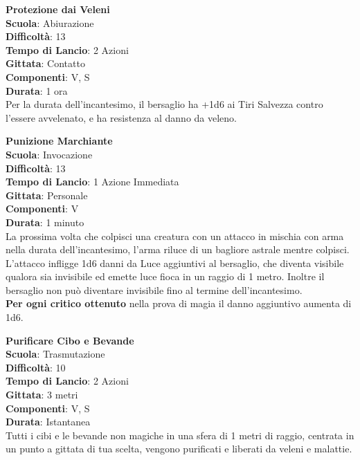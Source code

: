 \begin{multicols}{2}
\medskip\textbf{Protezione dai Veleni}\\
\textbf{Scuola}: Abiurazione\\
\textbf{Difficoltà}: 13\\
\textbf{Tempo di Lancio}: 2 Azioni\\
\textbf{Gittata}: Contatto\\
\textbf{Componenti}: V, S\\
\textbf{Durata}: 1 ora\\
Per la durata dell'incantesimo, il bersaglio ha +1d6 ai Tiri Salvezza contro l'essere avvelenato, e ha resistenza al danno da veleno.

\medskip\textbf{Punizione Marchiante}\\
\textbf{Scuola}: Invocazione\\
\textbf{Difficoltà}: 13\\
\textbf{Tempo di Lancio}: 1 Azione Immediata\\
\textbf{Gittata}: Personale\\
\textbf{Componenti}: V\\
\textbf{Durata}: 1 minuto\\
La prossima volta che colpisci una creatura con un attacco in mischia con arma nella durata dell'incantesimo, l'arma riluce di un bagliore astrale mentre colpisci. L'attacco infligge 1d6 danni da Luce aggiuntivi al bersaglio, che diventa visibile qualora sia invisibile ed emette luce fioca in un raggio di 1 metro. Inoltre il bersaglio non può diventare invisibile fino al termine dell'incantesimo. \\
\textbf{Per ogni critico ottenuto} nella prova di magia il danno aggiuntivo aumenta di 1d6.

\medskip\textbf{Purificare Cibo e Bevande}\\
\textbf{Scuola}: Trasmutazione\\
\textbf{Difficoltà}: 10\\
\textbf{Tempo di Lancio}: 2 Azioni\\
\textbf{Gittata}: 3 metri\\
\textbf{Componenti}: V, S\\
\textbf{Durata}: Istantanea\\
Tutti i cibi e le bevande non magiche in una sfera di 1 metri di raggio, centrata in un punto a gittata di tua scelta, vengono purificati e liberati da veleni e malattie. 


\end{multicols}
